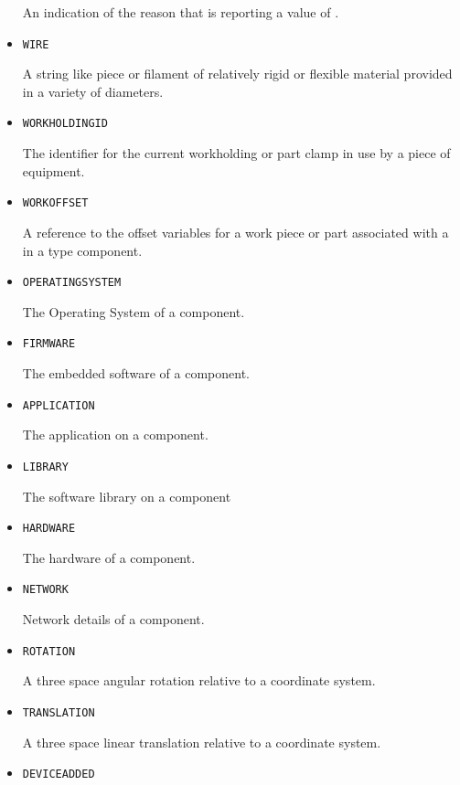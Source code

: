 \begin{itemize}
An indication of the reason that  is reporting a value of .


\item \texttt{WIRE}  

A string like piece or filament of relatively rigid or flexible material provided in a variety of diameters.


\item \texttt{WORKHOLDING\textunderscore ID}  

The identifier for the current workholding or part clamp in use by a piece of equipment.


\item \texttt{WORK\textunderscore OFFSET}  

A reference to the offset variables for a work piece or part associated with a  in a  type component.


\item \texttt{OPERATING\textunderscore SYSTEM}  

The Operating System of a component.


\item \texttt{FIRMWARE}  

The embedded software of a component.



\item \texttt{APPLICATION}  

The application on a component.


\item \texttt{LIBRARY}  

The software library on a component


\item \texttt{HARDWARE}  

The hardware of a component.



\item \texttt{NETWORK}  

Network details of a component.


\item \texttt{ROTATION}  

A three space angular rotation relative to a coordinate system.


\item \texttt{TRANSLATION}  

A three space linear translation relative to a coordinate system.


\item \texttt{DEVICE\textunderscore ADDED}  


\end{itemize}
